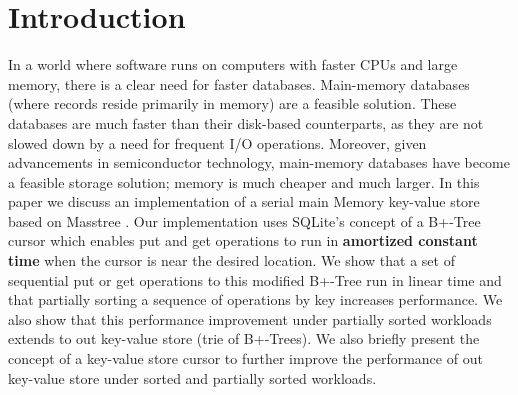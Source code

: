 \section{Introduction} \label{sec:introduction}

In a world where software runs on computers with faster CPUs and large memory, there is a clear need for faster databases. Main-memory databases (where records reside primarily in memory) are a feasible solution. These databases are much faster than their disk-based counterparts, as they are not slowed down by a need for frequent I/O operations. Moreover, given advancements in semiconductor technology, main-memory databases have become a feasible storage solution; memory is much cheaper and much larger. In this paper we discuss an implementation of a serial main Memory key-value store based on Masstree \cite{masstree}. Our implementation uses SQLite's \cite{SQLite} concept of a B+-Tree cursor which enables put and get operations to run in \textbf{amortized constant time} when the cursor is near the desired location. We show that a set of sequential put or get operations to this modified B+-Tree run in linear time and that partially sorting a sequence of operations by key increases performance. We also show that this performance improvement under partially sorted workloads extends to out key-value store (trie of B+-Trees). We also briefly present the concept of a key-value store cursor to further improve the performance of out key-value store under sorted and partially sorted workloads.

\begin{comment}
    Experiments and proof that B+-Tree has amortized linear behavior
    Experiments / analysis showing that overall kv store can have amortized linear time.

\end{comment}

